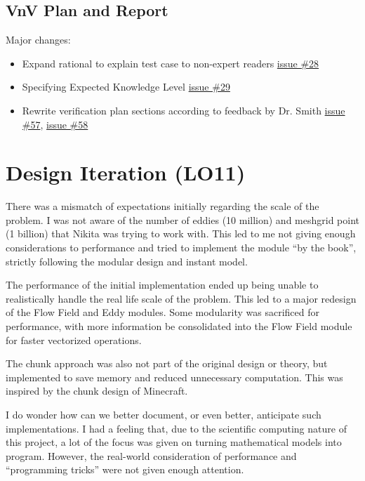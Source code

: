 \documentclass{article}
\begin{document}
\subsection{VnV Plan and Report}
Major changes:
\begin{itemize}
    \item Expand rational to explain test case to non-expert readers \href{https://github.com/omltcat/turbulent-flow/issues/28}{issue \#28}
    \item Specifying Expected Knowledge Level \href{https://github.com/omltcat/turbulent-flow/issues/29}{issue \#29}
    \item Rewrite verification plan sections according to feedback by Dr. Smith \href{https://github.com/omltcat/turbulent-flow/issues/57}{issue \#57}, \href{https://github.com/omltcat/turbulent-flow/issues/58}{issue \#58}
\end{itemize}

\section{Design Iteration (LO11)}

There was a mismatch of expectations initially regarding the scale of the problem. I was not aware of the number of eddies (10 million) and meshgrid point (1 billion) that Nikita was trying to work with. This led to me not giving enough considerations to performance and tried to implement the module ``by the book'', strictly following the modular design and instant model. 

The performance of the initial implementation ended up being unable to realistically handle the real life scale of the problem. This led to a major redesign of the Flow Field and Eddy modules. Some modularity was sacrificed for performance, with more information be consolidated into the Flow Field module for faster vectorized operations. 

The chunk approach was also not part of the original design or theory, but implemented to save memory and reduced unnecessary computation. This was inspired by the chunk design of Minecraft. 

I do wonder how can we better document, or even better, anticipate such implementations. I had a feeling that, due to the scientific computing nature of this project, a lot of the focus was given on turning mathematical models into program. However, the real-world consideration of performance and ``programming tricks'' were not given enough attention.
\end{document}
